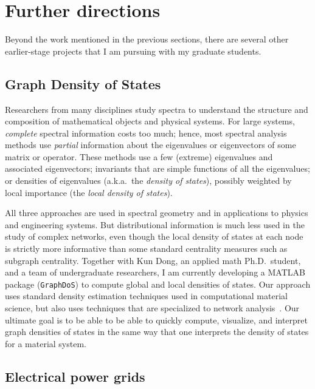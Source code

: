 \documentclass[11pt]{amsart}
\begin{document}
\section{Further directions}
\label{sec-directions}

Beyond the work mentioned in the previous sections, there are
several other earlier-stage projects that I am pursuing with my
graduate students.

\subsection*{Graph Density of States}

Researchers from many disciplines study spectra to understand the
structure and composition of mathematical objects and physical systems.
For large systems, {\em complete} spectral information costs too much;
hence, most spectral analysis methods use {\em partial} information
about the eigenvalues or eigenvectors of some matrix or operator.
These methods use a few (extreme) eigenvalues and
associated eigenvectors; invariants that are simple functions of all the
eigenvalues; or densities of eigenvalues (a.k.a.~the {\em density of states}),
possibly weighted by local importance (the {\em local density of states}).

All three approaches are used in spectral geometry and in applications to
physics and engineering systems.  But distributional information is much
less used in the study of complex networks, even though the local
density of states at each node is strictly more informative than
some standard centrality measures such as subgraph centrality.
Together with Kun Dong, an applied math Ph.D.~student, and a team of
undergraduate researchers, I am currently developing a MATLAB package
({\tt GraphDoS}) to compute global and local densities of states.
Our approach uses standard density estimation techniques used in
computational material science, but also uses techniques that are
specialized to network analysis~\cite{2015-siam-ns}.  Our ultimate
goal is to be able to be able to quickly compute, visualize, and
interpret graph densities of states in the same
way that one interprets the density of states for a material system.

\subsection*{Electrical power grids}

\end{document}
